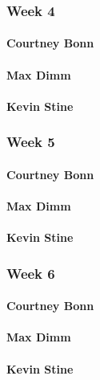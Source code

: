 \documentclass[letterpaper,10pt,draftclsnofoot,onecolumn,titlepage]{IEEEtran}
\begin{document}
		\subsubsection{Week 4}
		
			\paragraph{Courtney Bonn}

			\paragraph{Max Dimm}
			
			\paragraph{Kevin Stine}
			
		\subsubsection{Week 5}
		
			\paragraph{Courtney Bonn}

			\paragraph{Max Dimm}
			
			\paragraph{Kevin Stine}
			
		\subsubsection{Week 6}
		
			\paragraph{Courtney Bonn}

			\paragraph{Max Dimm}
			
			\paragraph{Kevin Stine}
			
\end{document}
